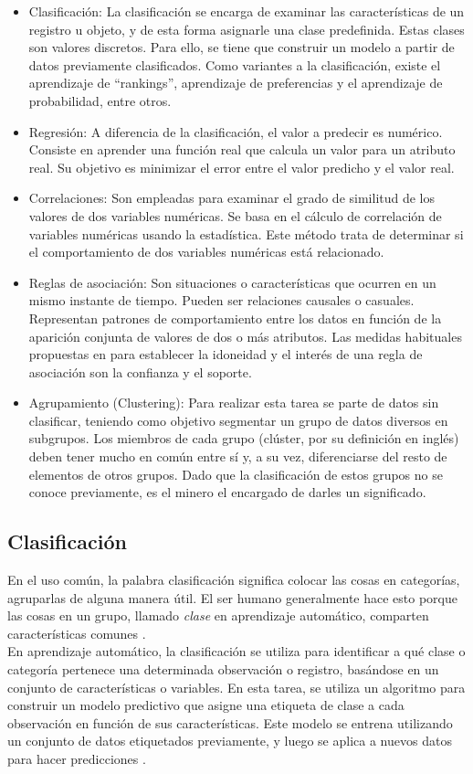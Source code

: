 \begin{itemize}
	\item Clasificación: La clasificación se encarga de examinar las características de un registro u objeto, y de esta forma asignarle una clase predefinida. Estas clases son valores discretos. Para ello, se tiene que construir un modelo a partir de datos previamente clasificados. Como variantes a la clasificación, existe el aprendizaje de “rankings”, aprendizaje de preferencias y el aprendizaje de probabilidad, entre otros. 
	\item Regresión: A diferencia de la clasificación, el valor a predecir es numérico. Consiste en aprender una función real que calcula un valor para un atributo real. Su objetivo es minimizar el error entre el valor predicho y el valor real.
	\item  Correlaciones: Son empleadas para examinar el grado de similitud de los valores de dos variables numéricas. Se basa en el cálculo de correlación de variables numéricas usando la estadística. Este método trata de determinar si el comportamiento de dos variables numéricas está relacionado.
	\item Reglas de asociación: Son situaciones o características que ocurren en un mismo instante de tiempo. Pueden ser relaciones causales o casuales. Representan patrones de comportamiento entre los datos en función de la aparición conjunta de valores de dos o más atributos. Las medidas habituales propuestas en \citep{Agrawal1519}	para establecer la idoneidad y el interés de una regla de asociación son la confianza y el soporte.
	\item	Agrupamiento (Clustering): Para realizar esta tarea se parte de datos sin clasificar, teniendo como objetivo segmentar un grupo de datos diversos en subgrupos. Los miembros de cada grupo (clúster, por su definición en inglés) deben tener mucho en común entre sí y, a su vez, diferenciarse del resto de elementos de otros grupos. Dado que la clasificación de estos grupos no se conoce previamente, es el minero el encargado de darles un significado.
\end{itemize}

\subsection{Clasificación}
En el uso común, la palabra clasificación significa colocar las cosas en categorías, agruparlas de alguna manera útil. El ser humano generalmente hace esto porque las cosas en un grupo, llamado \textit{clase} en aprendizaje automático, comparten características comunes \citep{sammut2011encyclopedia}. \\
En aprendizaje automático, la clasificación se utiliza para identificar a qué clase o categoría pertenece una determinada observación o registro, basándose en un conjunto de características o variables. En esta tarea, se utiliza un algoritmo para construir un modelo predictivo que asigne una etiqueta de clase a cada observación en función de sus características. Este modelo se entrena utilizando un conjunto de datos etiquetados previamente, y luego se aplica a nuevos datos para hacer predicciones \citep{sammut2011encyclopedia}.

